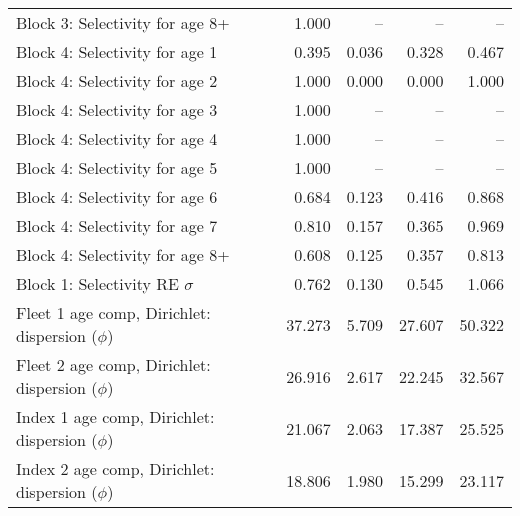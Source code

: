 \documentclass[
]{article}
\begin{document}
\begin{landscape}
\begin{longtable}[t]{lrrrr}
\addlinespace
Block 3: Selectivity for age 8+ & 1.000 & -- & -- & --\\
Block 4: Selectivity for age 1 & 0.395 & 0.036 & 0.328 & 0.467\\
Block 4: Selectivity for age 2 & 1.000 & 0.000 & 0.000 & 1.000\\
Block 4: Selectivity for age 3 & 1.000 & -- & -- & --\\
Block 4: Selectivity for age 4 & 1.000 & -- & -- & --\\
\addlinespace
Block 4: Selectivity for age 5 & 1.000 & -- & -- & --\\
Block 4: Selectivity for age 6 & 0.684 & 0.123 & 0.416 & 0.868\\
Block 4: Selectivity for age 7 & 0.810 & 0.157 & 0.365 & 0.969\\
Block 4: Selectivity for age 8+ & 0.608 & 0.125 & 0.357 & 0.813\\
Block 1: Selectivity RE $\sigma$ & 0.762 & 0.130 & 0.545 & 1.066\\
\addlinespace
Fleet 1 age comp, Dirichlet: dispersion ($\phi$) & 37.273 & 5.709 & 27.607 & 50.322\\
Fleet 2 age comp, Dirichlet: dispersion ($\phi$) & 26.916 & 2.617 & 22.245 & 32.567\\
Index 1 age comp, Dirichlet: dispersion ($\phi$) & 21.067 & 2.063 & 17.387 & 25.525\\
Index 2 age comp, Dirichlet: dispersion ($\phi$) & 18.806 & 1.980 & 15.299 & 23.117\\*
\end{longtable}
\end{landscape}
\end{document}
